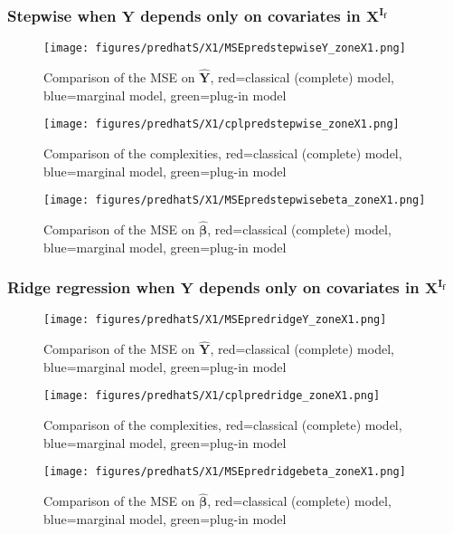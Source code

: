 \documentclass[12pt,a4paper]{report}
\begin{document}
\subsubsection{Stepwise when $\boldsymbol{Y}$ depends only on covariates in $\boldsymbol{X^{I_f}}$}

	\begin{figure}[h!]
	\centering
		  \texttt{[image: figures/predhatS/X1/MSEpredstepwiseY\_zoneX1.png]}
		\caption{Comparison of the MSE on $\hat{\boldsymbol{Y}}$, red=classical (complete) model, blue=marginal model, green=plug-in model}\label{MSEpredstepwiseY_zoneX1}
	\end{figure}
	\begin{figure}[h!]
	\centering
		  \texttt{[image: figures/predhatS/X1/cplpredstepwise\_zoneX1.png]}
		\caption{Comparison of the complexities, red=classical (complete) model, blue=marginal model, green=plug-in model}\label{cplpredstepwise_zoneX1}
	\end{figure}
	\begin{figure}[h!]
	\centering
		  \texttt{[image: figures/predhatS/X1/MSEpredstepwisebeta\_zoneX1.png]}
		\caption{Comparison of the MSE on $\hat{\boldsymbol{\beta}}$, red=classical (complete) model, blue=marginal model, green=plug-in model}\label{MSEpredstepwisebeta_zoneX1}
	\end{figure}
	\FloatBarrier
\newpage
\subsubsection{Ridge regression when $\boldsymbol{Y}$ depends only on covariates in $\boldsymbol{X^{I_f}}$}

\begin{figure}[h!]
	\centering
		  \texttt{[image: figures/predhatS/X1/MSEpredridgeY\_zoneX1.png]}
		\caption{Comparison of the MSE on $\hat{\boldsymbol{Y}}$, red=classical (complete) model, blue=marginal model, green=plug-in model}\label{MSEpredridgeY_zoneX1}
	\end{figure}
	\begin{figure}[h!]
	\centering
		  \texttt{[image: figures/predhatS/X1/cplpredridge\_zoneX1.png]}
		\caption{Comparison of the complexities, red=classical (complete) model, blue=marginal model, green=plug-in model}\label{cplpredridge_zoneX1}
	\end{figure}
	\begin{figure}[h!]
	\centering
		  \texttt{[image: figures/predhatS/X1/MSEpredridgebeta\_zoneX1.png]}
		\caption{Comparison of the MSE on $\hat{\boldsymbol{\beta}}$, red=classical (complete) model, blue=marginal model, green=plug-in model}\label{MSEpredridgebeta_zoneX1}
	\end{figure}
	\FloatBarrier
\end{document}
